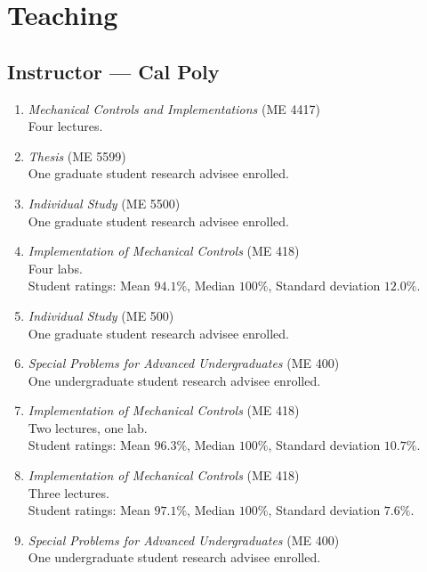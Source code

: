 \section{Teaching}

\subsection{Instructor --- Cal Poly}
\begin{enumerate}[label={\arabic*.}]
	\item \textit{Mechanical Controls and Implementations} (ME 4417)  \\
	Four lectures.
	\item \textit{Thesis} (ME 5599)  \\
	One graduate student research advisee enrolled.
	\item \textit{Individual Study} (ME 5500)  \\
	One graduate student research advisee enrolled.
	\item \textit{Implementation of Mechanical Controls} (ME 418)  \\
	Four labs. \\
	Student ratings: Mean $94.1\%$, Median $100\%$, Standard deviation $12.0\%$.
	\item \textit{Individual Study} (ME 500)  \\
	One graduate student research advisee enrolled.
	\item \textit{Special Problems for Advanced Undergraduates} (ME 400)  \\
	One undergraduate student research advisee enrolled.
\item \textit{Implementation of Mechanical Controls} (ME 418)  \\
	Two lectures, one lab. \\
	Student ratings: Mean $96.3\%$, Median $100\%$, Standard deviation $10.7\%$.
	\item \textit{Implementation of Mechanical Controls} (ME 418)  \\
	Three lectures. \\
	Student ratings: Mean $97.1\%$, Median $100\%$, Standard deviation $7.6\%$.
	\item \textit{Special Problems for Advanced Undergraduates} (ME 400)  \\
	One undergraduate student research advisee enrolled.

\end{enumerate}
